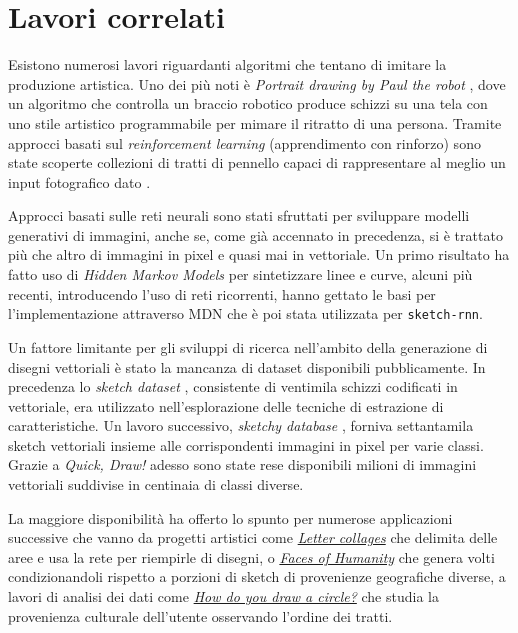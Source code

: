 \section{Lavori correlati}
Esistono numerosi lavori riguardanti algoritmi che tentano di imitare la produzione artistica. Uno dei più noti è \textit{Portrait drawing by Paul the robot} \cite{paul}, dove un algoritmo che controlla un braccio robotico produce schizzi su una tela con uno stile artistico programmabile per mimare il ritratto di una persona. Tramite approcci basati sul \textit{reinforcement learning} (apprendimento con rinforzo) sono state scoperte collezioni di tratti di pennello capaci di rappresentare al meglio un input fotografico dato \cite{oriental}.

Approcci basati sulle reti neurali sono stati sfruttati per sviluppare modelli generativi di immagini, anche se, come già accennato in precedenza, si è trattato più che altro di immagini in pixel e quasi mai in vettoriale. Un primo risultato ha fatto uso di \textit{Hidden Markov Models} per sintetizzare linee e curve, alcuni più recenti, introducendo l'uso di reti ricorrenti, hanno gettato le basi per l'implementazione attraverso MDN che è poi stata utilizzata per \texttt{sketch-rnn}.

Un fattore limitante per gli sviluppi di ricerca nell'ambito della generazione di disegni vettoriali è stato la mancanza di dataset disponibili pubblicamente. In precedenza lo \textit{sketch dataset} \cite{sketch}, consistente di ventimila schizzi codificati in vettoriale, era utilizzato nell'esplorazione delle tecniche di estrazione di caratteristiche. Un lavoro successivo, \textit{sketchy database} \cite{sketchy}, forniva settantamila sketch vettoriali insieme alle corrispondenti immagini in pixel per varie classi. Grazie a \textit{Quick, Draw!} adesso sono state rese disponibili milioni di immagini vettoriali suddivise in centinaia di classi diverse.

La maggiore disponibilità ha offerto lo spunto per numerose applicazioni successive che vanno da progetti artistici come \href{http://frauzufall.de/en/2017/google-quick-draw/}{\textit{Letter collages}} che delimita delle aree e usa la rete per riempirle di disegni, o \href{http://project.laboiteatortue.com/facesofhumanity/}{\textit{Faces of Humanity}} che genera volti condizionandoli rispetto a porzioni di sketch di provenienze geografiche diverse, a lavori di analisi dei dati come \href{https://qz.com/994486/the-way-you-draw-circles-says-a-lot-about-you/}{\textit{How do you draw a circle?}} che studia la provenienza culturale dell'utente osservando l'ordine dei tratti.

